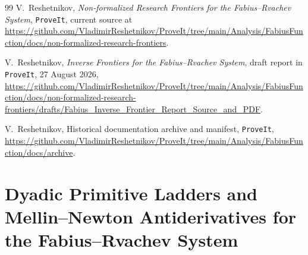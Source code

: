 \documentclass[11pt,oneside]{article}
\newcommand{\integrationreportreset}{%
  \clearpage
  \setcounter{section}{0}%
  \renewcommand{\thesection}{\arabic{section}}}
\theoremstyle{definition}
\theoremstyle{remark}
\newcommand{\1}{\mathbf 1}
\begin{document}
\begin{thebibliography}{99}
V.~Reshetnikov,
\newblock \emph{Non-formalized Research Frontiers for the Fabius--Rvachev System},
\newblock \texttt{ProveIt}, current source at
\url{https://github.com/VladimirReshetnikov/ProveIt/tree/main/Analysis/FabiusFunction/docs/non-formalized-research-frontiers}.

V.~Reshetnikov,
\newblock \emph{Inverse Frontiers for the Fabius--Rvachev System},
\newblock draft report in \texttt{ProveIt}, 27 August 2026,
\url{https://github.com/VladimirReshetnikov/ProveIt/tree/main/Analysis/FabiusFunction/docs/non-formalized-research-frontiers/drafts/Fabius_Inverse_Frontier_Report_Source_and_PDF}.

V.~Reshetnikov,
\newblock Historical documentation archive and manifest,
\newblock \texttt{ProveIt},
\url{https://github.com/VladimirReshetnikov/ProveIt/tree/main/Analysis/FabiusFunction/docs/archive}.

\end{thebibliography}


\newcommand{\QPartl}{\mathbb Q}
\newcommand{\sincPartl}{\operatorname{sinc}}
\newcommand{\wtPartl}{s_2}
\newcommand{\FP}{\operatorname{FP}}
\newcommand{\Bell}{\mathcal B}
\newcommand{\repoPartl}{\textsc{ProveIt}}
\newtheorem{problem}[theorem]{Open problem}

\integrationreportreset
\part[Dyadic primitive ladders and Mellin--Newton antiderivatives]
{Dyadic Primitive Ladders and Mellin--Newton Antiderivatives for the Fabius--Rvachev System}
\end{document}
